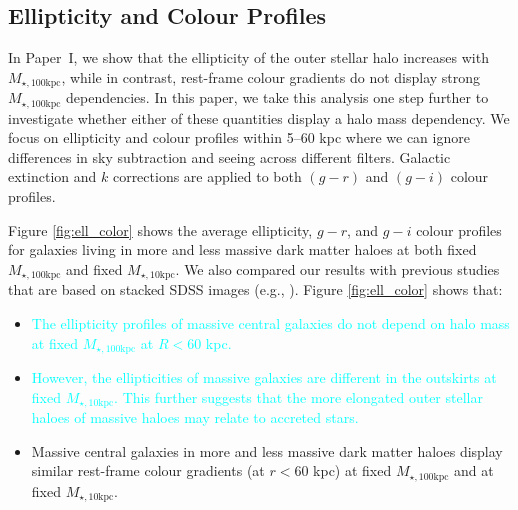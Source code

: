 \documentclass[a4paper,fleqn,usenatbib]{mnras}
\def\minn{{$M_{\star,10\mathrm{kpc}}$}}
\def\mtot{{$M_{\star,100\mathrm{kpc}}$}}
\newcommand{\song}[1]{\textcolor{cyan}{#1}}
\begin{document}
\subsection{Ellipticity and Colour Profiles}
    \label{ssec:ell_color}
    
    In Paper~I, we show that the ellipticity of the outer stellar halo increases with
    \mtot{}, while in contrast, rest-frame colour gradients do not display strong 
    \mtot{} dependencies. 
    In this paper, we take this analysis one step further to investigate whether either 
    of these quantities display a halo mass dependency. 
    We focus on ellipticity and colour profiles within 5--60 kpc where we can ignore
    differences in sky subtraction and seeing across different filters. 
    Galactic extinction and $k$ corrections are applied to both $(g-r)$ and $(g-i)$ 
    colour profiles.
    
    Figure \ref{fig:ell_color} shows the average ellipticity, $g-r$, and $g-i$ colour 
    profiles for galaxies living in more and less massive dark matter haloes at both 
    fixed \mtot{} and fixed \minn{}. 
    We also compared our results with previous studies that are based on stacked SDSS 
    images (e.g., \citealt{LaBarbera2010, Tal2011, DSouza2014}). 
    Figure \ref{fig:ell_color} shows that: 
    
    \begin{itemize}
        \item \song{
            The ellipticity profiles of massive central galaxies do not depend on 
            halo mass at fixed \mtot{} at $R<60$ kpc. 
            }       
                
        \item \song{
            However, the ellipticities of massive galaxies are different in the 
            outskirts at fixed \minn{}. 
            This further suggests that the more elongated outer stellar haloes 
            of massive haloes may relate to accreted stars.
            }
                     
        \item Massive central galaxies in more and less massive dark matter haloes 
            display similar rest-frame colour gradients (at $r<60$ kpc) at fixed 
            \mtot{} and at fixed \minn{}.    
            
    \end{itemize}
    
\end{document}
